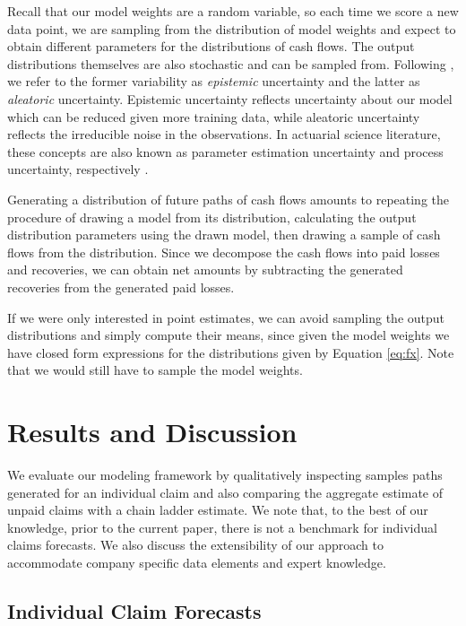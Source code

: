 \documentclass{article}
\begin{document}
Recall that our model weights are a random variable, so each time we score a new
data point, we are sampling from the distribution of model weights and expect to
obtain different parameters for the distributions of cash flows. The output 
distributions themselves are also stochastic and can be sampled from. Following
\cite{kendallWhatUncertainties2017}, we refer to the former variability as 
\textit{epistemic} uncertainty and the latter as \textit{aleatoric} uncertainty.
Epistemic uncertainty reflects uncertainty about our model which can be reduced
given more training data, while aleatoric uncertainty reflects the irreducible 
noise in the observations. In actuarial science literature, these concepts are 
also known as parameter estimation uncertainty and process uncertainty, 
respectively \cite{wuthrichNonlifeInsurance2017}.

Generating a distribution of future paths of cash flows amounts to repeating the
procedure of drawing a model from its distribution, calculating the output 
distribution parameters using the drawn model, then drawing a sample of cash 
flows from the distribution. Since we decompose the cash flows into paid losses 
and recoveries, we can obtain net amounts by subtracting the generated 
recoveries from the generated paid losses.

If we were only interested in point estimates, we can avoid sampling the output
distributions and simply compute their means, since given the model weights we
have closed form expressions for the distributions given by Equation 
\ref{eq:fx}. Note that we would still have to sample the model weights.

\section {Results and Discussion}

We evaluate our modeling framework by qualitatively inspecting samples paths 
generated for an individual claim and also comparing the aggregate estimate of 
unpaid claims with a chain ladder estimate. We note that, to the best of our 
knowledge, prior to the current paper, there is not a benchmark for individual
claims forecasts. We also discuss the extensibility of our approach to 
accommodate company specific data elements and expert knowledge.

\subsection{Individual Claim Forecasts}
\end{document}
